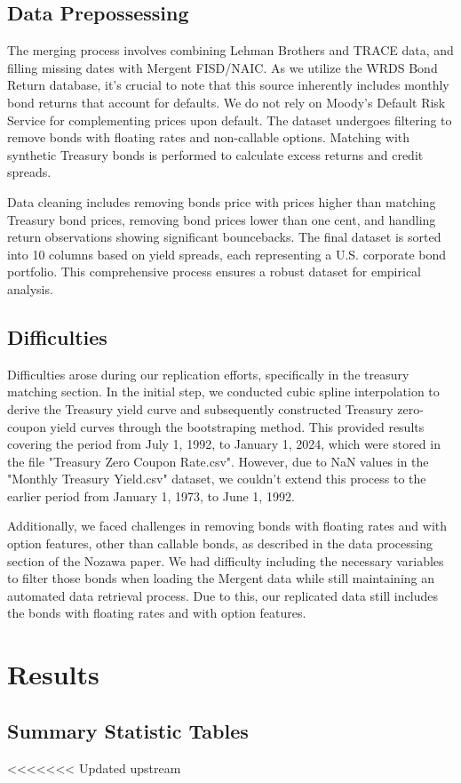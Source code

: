 \documentclass{article}
\begin{document}
\subsection{Data Prepossessing}

The merging process involves combining Lehman Brothers and TRACE data, and filling missing dates with Mergent FISD/NAIC. As we utilize the WRDS Bond Return database, it's crucial to note that this source inherently includes monthly bond returns that account for defaults. We do not rely on Moody's Default Risk Service for complementing prices upon default. The dataset undergoes filtering to remove bonds with floating rates and non-callable options. Matching with synthetic Treasury bonds is performed to calculate excess returns and credit spreads. 

Data cleaning includes removing bonds price with prices higher than matching Treasury bond prices, removing bond prices lower than one cent, and handling return observations showing significant bouncebacks. The final dataset is sorted into 10 columns based on yield spreads, each representing a U.S. corporate bond portfolio. This comprehensive process ensures a robust dataset for empirical analysis. 

\subsection{Difficulties}

Difficulties arose during our replication efforts, specifically in the treasury matching section. In the initial step, we conducted cubic spline interpolation to derive the Treasury yield curve and subsequently constructed Treasury zero-coupon yield curves through the bootstraping method. This provided results covering the period from July 1, 1992, to January 1, 2024, which were stored in the file "Treasury Zero Coupon Rate.csv". However, due to NaN values in the "Monthly Treasury Yield.csv" dataset, we couldn't extend this process to the earlier period from January 1, 1973, to June 1, 1992. 

Additionally, we faced challenges in removing bonds with floating rates and with option features, other than callable bonds, as described in the data processing section of the Nozawa paper. We had difficulty including the necessary variables to filter those bonds when loading the Mergent data while still maintaining an automated data retrieval process. Due to this, our replicated data still includes the bonds with floating rates and with option features. 

\section{ Results}

\subsection{Summary Statistic Tables}




<<<<<<< Updated upstream
\end{document}
